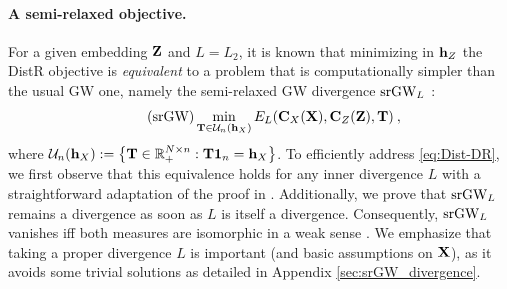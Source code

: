\paragraph{A semi-relaxed objective.} For a given embedding ${\mathbf{Z}}$ and $L=L_2$, it is known that minimizing in ${\mathbf{h}}_{Z}$ the DistR objective is \emph{equivalent} to a problem that is computationally simpler than the usual GW one, namely the semi-relaxed GW divergence $\operatorname{srGW}_L$ \cite{vincent2021semi}:
\begin{equation*}\tag{srGW} \label{eq:srGW}
	\min_{{\mathbf{T}} \in {\mathcal{U}}_n({\mathbf{h}}_X)} E_L({\mathbf{C}}_{X}({\mathbf{X}}), {\mathbf{C}}_{Z}({\mathbf{Z}}), {\mathbf{T}}) \:,
\end{equation*}
where ${\mathcal{U}}_n({\mathbf{h}}_X) := \left\{ {\mathbf{T}} \in \mathbb{R}_{+}^{N \times n}: {\mathbf{T}} \bm{1}_n = {\mathbf{h}}_X\right\}$. To efficiently address \cref{eq:Dist-DR}, we first observe that this equivalence holds for any inner divergence $L$ with a straightforward adaptation of the proof in \citet{vincent2021semi}. 
Additionally, we prove that $\operatorname{srGW}_L$ remains a divergence as soon as $L$ is itself a divergence. Consequently, $\operatorname{srGW}_L$ vanishes iff both measures are isomorphic in a weak sense \cite{chowdhury2019gromov}. We emphasize that taking a proper divergence $L$ is important (and basic assumptions on ${\mathbf{X}}$), as it avoids some trivial solutions as detailed in Appendix \ref{sec:srGW_divergence}.





